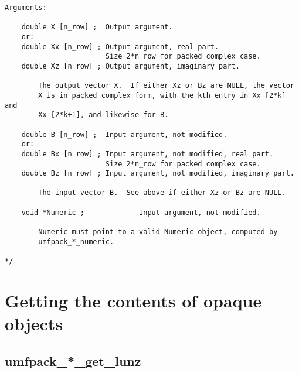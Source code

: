 \documentclass[11pt]{article}
\begin{document}
{\begin{verbatim}
Arguments:

    double X [n_row] ;  Output argument.
    or:
    double Xx [n_row] ; Output argument, real part.
                        Size 2*n_row for packed complex case.
    double Xz [n_row] ; Output argument, imaginary part.

        The output vector X.  If either Xz or Bz are NULL, the vector
        X is in packed complex form, with the kth entry in Xx [2*k] and
        Xx [2*k+1], and likewise for B.

    double B [n_row] ;  Input argument, not modified.
    or:
    double Bx [n_row] ; Input argument, not modified, real part.
                        Size 2*n_row for packed complex case.
    double Bz [n_row] ; Input argument, not modified, imaginary part.

        The input vector B.  See above if either Xz or Bz are NULL.

    void *Numeric ;             Input argument, not modified.

        Numeric must point to a valid Numeric object, computed by
        umfpack_*_numeric.

*/
\end{verbatim}
}

\newpage
\section{Getting the contents of opaque objects}
\label{Get}

\subsection{umfpack\_*\_get\_lunz}
\end{document}
